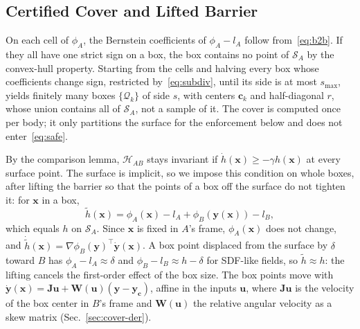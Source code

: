 \subsection{Certified Cover and Lifted Barrier}
On each cell of $\phi_A$, the Bernstein coefficients of $\phi_A-l_A$ follow from~\eqref{eq:b2b}. If
they all have one strict sign on a box, the box contains no point of $\mathcal S_A$ by the
convex-hull property. Starting from the cells and halving every box whose coefficients change sign,
restricted by~\eqref{eq:subdiv}, until its side is at most $s_{\max}$, yields finitely many boxes
$\{\mathcal Q_k\}$ of side $s$, with centers $\mathbf c_k$ and half-diagonal $r$, whose union contains
all of $\mathcal S_A$, not a sample of it. The cover is computed once per body; it only partitions
the surface for the enforcement below and does not enter~\eqref{eq:safe}.

By the comparison lemma, $\mathcal H_{AB}$ stays invariant if $\dot h(\mathbf x)\ge-\gamma h(\mathbf x)$
at every surface point. The surface is implicit, so we impose this condition on whole boxes, after
lifting the barrier so that the points of a box off the surface do not tighten it: for $\mathbf x$ in a
box,
\begin{equation}\label{eq:lift}
\tilde h(\mathbf x)=\phi_A(\mathbf x)-l_A+\phi_B(\mathbf y(\mathbf x))-l_B ,
\end{equation}
which equals $h$ on $\mathcal S_A$. Since $\mathbf x$ is fixed in $A$'s frame, $\phi_A(\mathbf x)$ does
not change, and $\dot{\tilde h}(\mathbf x)=\nabla\phi_B(\mathbf y)^\top\dot{\mathbf y}(\mathbf x)$. A
box point displaced from the surface by $\delta$ toward $B$ has $\phi_A-l_A\approx\delta$ and
$\phi_B-l_B\approx h-\delta$ for SDF-like fields, so $\tilde h\approx h$: the lifting cancels the
first-order effect of the box size. The box points move with
$\dot{\mathbf y}(\mathbf x)=\mathbf J\mathbf u+\mathbf W(\mathbf u)(\mathbf y-\mathbf y_{\mathbf c})$,
affine in the inputs $\mathbf u$, where $\mathbf J\mathbf u$ is the velocity of the box center in
$B$'s frame and $\mathbf W(\mathbf u)$ the relative angular velocity as a skew matrix
(Sec.~\ref{sec:cover-der}).

